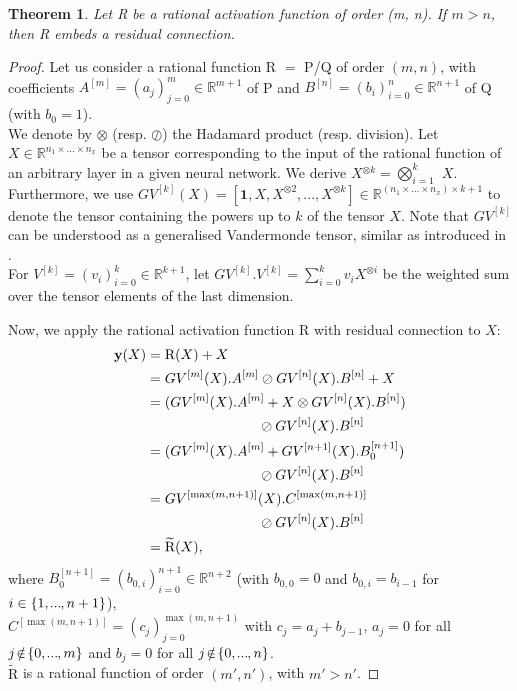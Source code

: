 \documentclass[accepted]{article}
\theoremstyle{plain}
\newtheorem{theorem}{Theorem}[section]
\theoremstyle{definition}
\theoremstyle{remark}
\newcommand\mydots{\makebox[0.7em][c]{.\hfil.\hfil.}}
\begin{document}
\begin{theorem}
\label{thm:bigtheorem}
Let R be a rational activation function of order (m, n). If $m > n$, then R embeds a residual connection.
\end{theorem}
\begin{proof} 
Let us consider a rational function R $=$ P/Q of order $(m, n)$, with coefficients $A^{[m]}= (a_{j})_{j=0}^m \in \mathbb{R}^{m+1}$ of P and $B^{[n]}= (b_{i})_{i=0}^n \in \mathbb{R}^{n+1}$ of Q (with $b_0 = 1$). \\
We denote by $\otimes$ (resp. $\oslash$) the Hadamard product (resp. division). Let $X \in \mathbb{R}^{n_1 \times \dots \times n_x}$ be a tensor corresponding to the input of the rational function of an arbitrary layer in a given neural network. We derive $X$\hspace{0pt}$^{\otimes k} = \bigotimes_{i=1}^{k}$ $X$. \\ 
Furthermore, we use $GV^{[k]}(X) = [\textbf{1}, X, X^{\otimes 2}, ..., X^{\otimes k}] \in \mathbb{R}^{(n_1 \times \dots \times n_x) \times k+1}$ to denote the tensor containing the powers up to $k$ of the tensor $X$. Note that $GV^{[k]}$ can be understood as a generalised Vandermonde tensor, similar as introduced in \citep{xu2016generalized}. \\
For $V^{[k]}\! =\! (v_i)_{i=0}^k\! \in\! \mathbb{R}^{k+1}$, let $GV^{[k]}.V^{[k]}\! =\! \sum_{i=0}^k\! v_i X^{\otimes i}$ be the weighted sum over the tensor elements of the last dimension.

Now, we apply the rational activation function R with residual connection to $X$:
\begin{align*}
\small
\mathbf{y}(X) &= \text{R}(X) + X \\
             &= GV^{[m]}(X). A^{[m]} \oslash GV^{[n]}(X). B^{[n]} + X \\
  &= (GV^{[m]}(X). A^{[m]} + X \otimes GV^{[n]}(X). B^{[n]}) \\ & \qquad \qquad \qquad \qquad \oslash GV^{[n]}(X). B^{[n]} \\
  &= (GV^{[m]}(X). A^{[m]} + GV^{[n+1]}(X). B_0^{[n+1]}) \\ & \qquad \qquad \qquad \qquad \oslash GV^{[n]}(X). B^{[n]} \\
  &= GV^{[\max(m, n+1)]}(X). C^{[\max(m, n+1)]} \\ & \qquad \qquad \qquad \qquad \oslash GV^{[n]}(X). B^{[n]} \\
  &= \widetilde{\text{R}}(X),
\end{align*}
where $B_0^{[n+1]}= (b_{0, i})_{i=0}^{n+1} \in \mathbb{R}^{n+2}$ (with $b_{0,0} = 0$ and $b_{0, i} = b_{i-1}$ for $i \in \{1, \mydots, n+1\}$),\\
$C^{[\max(m,n+1)]} = (c_j)_{j=0}^{\max(m,n+1)}$ with $c_j = a_j + b_{j-1}$,  $a_j\! =\! 0$ for all $j\! \notin\! \{0, \mydots, m\}$ and $b_j\! =\! 0$ for all $j\! \notin\! \{0, \mydots, n\}$. \\
$\widetilde{\text{R}}$ is a rational function of order $(m', n')$,  with $m' > n'$. 
\end{proof}
\end{document}
